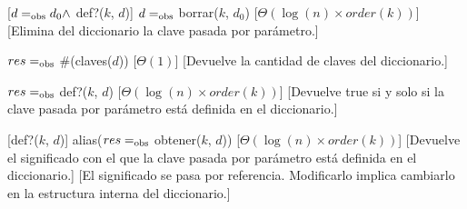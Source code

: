 \begin{Interfaz}
    [$d =_{\mathrm{obs}} d_0 \land$ def?($k$, $d$)]
    {$d =_{\mathrm{obs}}$ borrar($k$, $d_0$)}
    [$\Theta(\log(n) \times order(k))$]
    [Elimina del diccionario la clave pasada por par\'ametro.]

    {$res =_{\mathrm{obs}}$ \#(claves($d$))}
    [$\Theta(1)$]
    [Devuelve la cantidad de claves del diccionario.]

    {$res =_{\mathrm{obs}}$ def?($k$, $d$)}
    [$\Theta(\log(n) \times order(k))$]
    [Devuelve true si y solo si la clave pasada por par\'ametro est\'a definida en el diccionario.]

    [def?($k$, $d$)]
    {alias($res =_{\mathrm{obs}}$ obtener($k$, $d$))}
    [$\Theta(\log(n) \times order(k))$]
    [Devuelve el significado con el que la clave pasada por par\'ametro est\'a definida en el diccionario.]
    [El significado se pasa por referencia. Modificarlo implica cambiarlo en la estructura interna del diccionario.]

\end{Interfaz}

